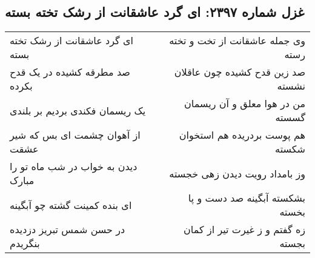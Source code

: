 \begin{center}
\section*{غزل شماره ۲۳۹۷: ای گرد عاشقانت از رشک تخته بسته}
\label{sec:2397}
\begin{longtable}{l p{0.5cm} r}
ای گرد عاشقانت از رشک تخته بسته
&&
وی جمله عاشقانت از تخت و تخته رسته
\\
صد مطرقه کشیده در یک قدح بکرده
&&
صد زین قدح کشیده چون عاقلان نشسته
\\
یک ریسمان فکندی بردیم بر بلندی
&&
من در هوا معلق و آن ریسمان گسسته
\\
از آهوان چشمت ای بس که شیر عشقت
&&
هم پوست بردریده هم استخوان شکسته
\\
دیدن به خواب در شب ماه تو را مبارک
&&
وز بامداد رویت دیدن زهی خجسته
\\
ای بنده کمینت گشته چو آبگینه
&&
بشکسته آبگینه صد دست و پا بخسته
\\
در حسن شمس تبریز دزدیده بنگریدم
&&
زه گفتم و ز غیرت تیر از کمان بجسته
\\
\end{longtable}
\end{center}
